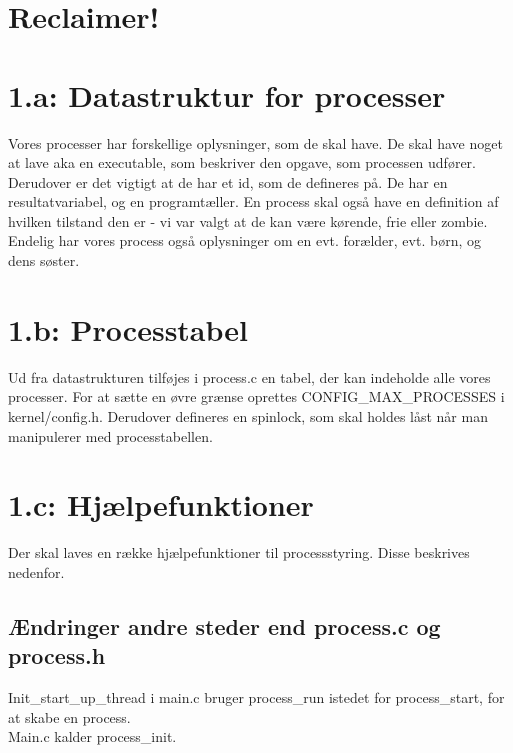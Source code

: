 \documentclass[10pt,a4paper,danish]{article}
\title{}
\author{Maria Caroline Miller, 040779, twq135 \\ Søren Pilgård, 190689, vpb984}
\begin{document}
\maketitle
\newpage


\section{Reclaimer!}


\section{1.a: Datastruktur for processer}
Vores processer har forskellige oplysninger, som de skal have. De skal have noget at lave aka en executable, som beskriver den opgave, som processen udfører. Derudover er det vigtigt at de har et id, som de defineres på. De har en resultatvariabel, og en programtæller. En process skal også have en definition af hvilken tilstand den er - vi var valgt at de kan være kørende, frie eller zombie. Endelig har vores process også oplysninger om en evt. forælder, evt. børn, og dens søster.

\section{1.b: Processtabel}
Ud fra datastrukturen tilføjes i process.c en tabel, der kan indeholde alle vores processer. For at sætte en øvre grænse oprettes CONFIG\_MAX\_PROCESSES i kernel/config.h. Derudover defineres en spinlock, som skal holdes låst når man manipulerer med processtabellen.

\section{1.c: Hjælpefunktioner}
Der skal laves en række hjælpefunktioner til processstyring. Disse beskrives nedenfor. 

\subsection{Ændringer andre steder end process.c og process.h}
Init\_start\_up\_thread i main.c bruger process\_run istedet for process\_start, for at skabe en process.\\

Main.c kalder process\_init.\\
\end{document}
